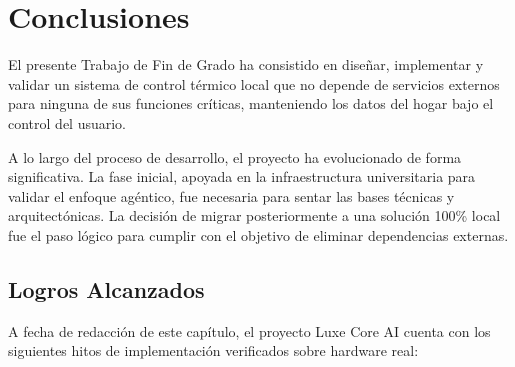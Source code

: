 \chapter{Conclusiones}
\label{cap:conclusiones}

El presente Trabajo de Fin de Grado ha consistido en diseñar, implementar y validar un sistema de control térmico local que no depende de servicios externos para ninguna de sus funciones críticas, manteniendo los datos del hogar bajo el control del usuario.

A lo largo del proceso de desarrollo, el proyecto ha evolucionado de forma significativa. La fase inicial, apoyada en la infraestructura universitaria para validar el enfoque agéntico, fue necesaria para sentar las bases técnicas y arquitectónicas. La decisión de migrar posteriormente a una solución 100\% local fue el paso lógico para cumplir con el objetivo de eliminar dependencias externas.

\section{Logros Alcanzados}

A fecha de redacción de este capítulo, el proyecto Luxe Core AI cuenta con los siguientes hitos de implementación verificados sobre hardware real:

